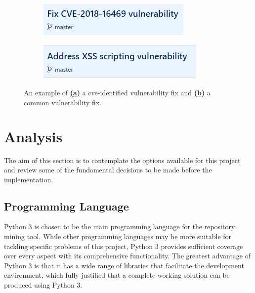 \documentclass[12pt, a4paper]{report}
\begin{document}
\begin{figure}[H]
  \centering
  \begin{subfigure}{.5\textwidth}
    \centering
    \includegraphics[width=.85\linewidth]{images/cve_vuln.png}
    \label{figure:cve_vuln}
  \end{subfigure}%
  \begin{subfigure}{.5\textwidth}
    \centering
    \includegraphics[width=.85\linewidth]{images/common_vuln.png}
    \label{figure:common_vuln}
  \end{subfigure}
  \caption[A comparison between a \acrshort{cve}-identified fixing commit and a common
  vulnerability-fixing commit.]%
  {An example of \hyperref[figure:cve_vuln]{\textbf{(a)}} a \acrshort{cve}-identified vulnerability
    fix and \hyperref[figure:common_vuln]{\textbf{(b)}} a common vulnerability fix.}
  \label{figure:fig_scope}
\end{figure}

\section{Analysis}
The aim of this section is to contemplate the options available for this project and review some of
the fundamental decisions to be made before the implementation.

\subsection{Programming Language}
Python 3 \cite{python} is chosen to be the main programming language for the repository mining tool.
While other programming languages may be more suitable for tackling specific problems of this
project, Python 3 provides sufficient coverage over every aspect with its comprehensive
functionality. The greatest advantage of Python 3 is that it has a wide range of libraries that
facilitate the development environment, which fully justified that a complete working solution can
be produced using Python 3.
\end{document}
